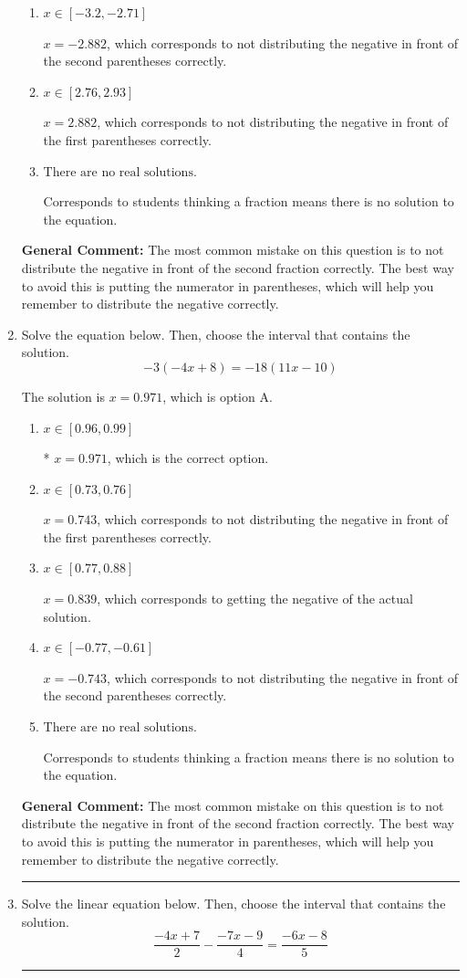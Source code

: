 \documentclass{extbook}[14pt]
\newcommand{\litem}[1]{\item #1

\rule{\textwidth}{0.4pt}}
\begin{document}
\begin{enumerate}
{\begin{enumerate}[label=\Alph*.]
$x = 2.579$, which corresponds to getting the negative of the actual solution.
\item \( x \in [-3.2, -2.71] \)

$x = -2.882$, which corresponds to not distributing the negative in front of the second parentheses correctly.
\item \( x \in [2.76, 2.93] \)

$x = 2.882$, which corresponds to not distributing the negative in front of the first parentheses correctly.
\item \( \text{There are no real solutions.} \)

Corresponds to students thinking a fraction means there is no solution to the equation.
\end{enumerate}

\textbf{General Comment:} The most common mistake on this question is to not distribute the negative in front of the second fraction correctly. The best way to avoid this is putting the numerator in parentheses, which will help you remember to distribute the negative correctly.
}
\litem{
Solve the equation below. Then, choose the interval that contains the solution.
\[ -3(-4x + 8) = -18(11x -10) \]

The solution is \( x = 0.971 \), which is option A.\begin{enumerate}[label=\Alph*.]
\item \( x \in [0.96, 0.99] \)

* $x = 0.971$, which is the correct option.
\item \( x \in [0.73, 0.76] \)

$x = 0.743$, which corresponds to not distributing the negative in front of the first parentheses correctly.
\item \( x \in [0.77, 0.88] \)

$x = 0.839$, which corresponds to getting the negative of the actual solution.
\item \( x \in [-0.77, -0.61] \)

$x = -0.743$, which corresponds to not distributing the negative in front of the second parentheses correctly.
\item \( \text{There are no real solutions.} \)

Corresponds to students thinking a fraction means there is no solution to the equation.
\end{enumerate}

\textbf{General Comment:} The most common mistake on this question is to not distribute the negative in front of the second fraction correctly. The best way to avoid this is putting the numerator in parentheses, which will help you remember to distribute the negative correctly.
}
\litem{
Solve the linear equation below. Then, choose the interval that contains the solution.
\[ \frac{-4x + 7}{2} - \frac{-7x -9}{4} = \frac{-6x -8}{5} \]

}
\end{enumerate}
\end{document}
